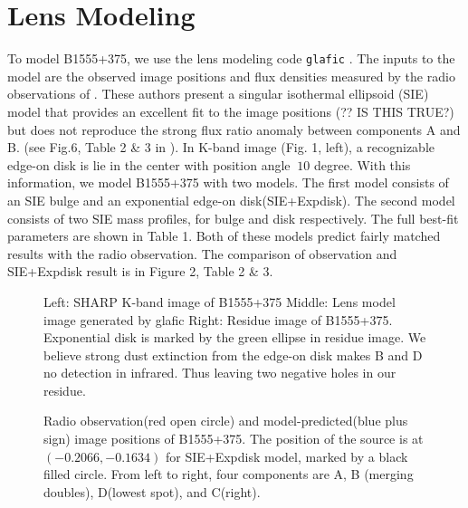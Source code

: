 \documentclass[manuscript]{emulateapj}
\begin{document}
\section{Lens Modeling}
To model B1555+375, we use the lens modeling code {\tt glafic}
\citep{Oguri}.  The inputs to the model are the observed image positions
and flux densities measured by the radio observations of \citet{Marlow}.
These authors present a singular isothermal ellipsoid (SIE) model that
provides an excellent fit to the image positions (?? IS THIS TRUE?) but
does not reproduce the strong flux ratio anomaly between components A and B.
(see Fig.6, Table 2 \& 3 in \citet{Marlow}). In K-band
image (Fig. 1, left), a recognizable edge-on disk is lie in the center
with position angle $~10$ degree. With this information, we model
B1555+375 with two models. The first model consists of an SIE bulge
and an exponential edge-on disk(SIE+Expdisk). The second model
consists of two SIE mass profiles, for bulge and disk
respectively. The full best-fit parameters are shown in Table 1. Both
of these models predict fairly matched results with the radio
observation. The comparison of observation and SIE+Expdisk result is
in Figure 2, Table 2 \& 3.




\begin{figure}
\caption{Left: SHARP K-band image of B1555+375 Middle: Lens model image generated by glafic Right: Residue image of B1555+375.\\
Exponential disk is marked by the green ellipse in residue image. We believe strong dust extinction from the edge-on disk makes B and D no detection in infrared. Thus leaving two negative holes in our residue.\label{fig1}}
\end{figure}

\begin{figure}
\caption{Radio observation(red open circle) and model-predicted(blue plus sign) image positions of B1555+375. The position of the source is at $(-0.2066,-0.1634)$ for SIE+Expdisk model, marked by a black filled circle. From left to right, four components are A, B (merging doubles), D(lowest spot), and C(right).\label{fig2}}
\end{figure}
\end{document}
